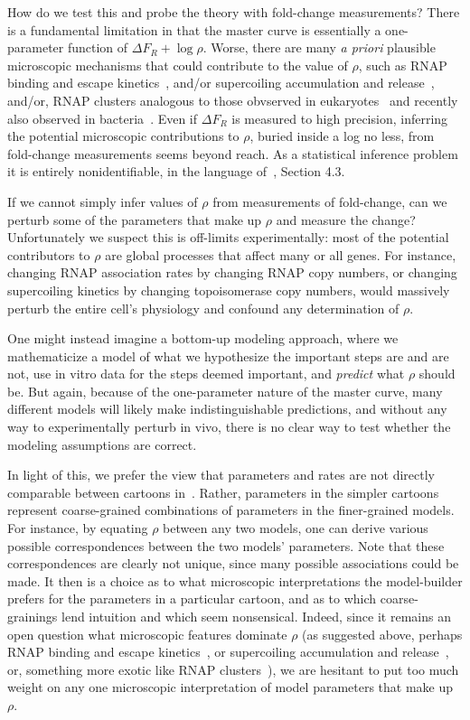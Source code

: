 How do we test this and probe the theory with fold-change measurements? There is
a fundamental limitation in that the master curve is essentially a one-parameter
function of $\Delta F_R + \log\rho$. Worse, there are many \textit{a priori}
plausible microscopic mechanisms that could contribute to the value of $\rho$,
such as RNAP binding and escape kinetics~\cite{DeHaseth1998, Mitarai2015},
and/or supercoiling accumulation and release~\cite{Chong2014, Sevier2016},
and/or, RNAP clusters analogous to those obvserved in
eukaryotes~\cite{Cisse2013, Cho2016} and recently also observed in
bacteria~\cite{Ladouceur2020}. Even if $\Delta F_R$ is measured to high
precision, inferring the potential microscopic contributions to $\rho$, buried
inside a log no less, from fold-change measurements seems beyond reach. As a
statistical inference problem it is entirely nonidentifiable, in the language
of~\cite{Gelman2013}, Section 4.3.

If we cannot simply infer values of $\rho$ from measurements of fold-change, can
we perturb some of the parameters that make up $\rho$ and measure the change?
Unfortunately we suspect this is off-limits experimentally: most of the
potential contributors to $\rho$ are global processes that affect many or all
genes. For instance, changing RNAP association rates by changing RNAP copy
numbers, or changing supercoiling kinetics by changing topoisomerase copy
numbers, would massively perturb the entire cell's physiology and confound any
determination of $\rho$.

One might instead imagine a bottom-up modeling approach, where we mathematicize a
model of what we hypothesize the important steps are and are not, use in vitro
data for the steps deemed important, and \textit{predict} what $\rho$ should be.
But again, because of the one-parameter nature of the master curve, many
different models will likely make indistinguishable predictions, and without any
way to experimentally perturb in vivo, there is no clear way to test whether the
modeling assumptions are correct.

In light of this, we prefer the view that parameters and rates are not directly
comparable between cartoons in~. Rather, parameters in
the simpler cartoons represent coarse-grained combinations of parameters in the
finer-grained models. For instance, by equating $\rho$ between any two models,
one can derive various possible correspondences between the two models'
parameters. Note that these correspondences are clearly not unique, since many
possible associations could be made. It then is a choice as to what microscopic
interpretations the model-builder prefers for the parameters in a particular
cartoon, and as to which coarse-grainings lend intuition and which seem
nonsensical. Indeed, since it remains an open question what microscopic features
dominate $\rho$ (as suggested above, perhaps RNAP binding and escape
kinetics~\cite{DeHaseth1998, Mitarai2015}, or supercoiling accumulation and
release~\cite{Chong2014, Sevier2016}, or, something more exotic like RNAP
clusters~\cite{Cisse2013, Cho2016, Ladouceur2020}), we are hesitant to put too
much weight on any one microscopic interpretation of model parameters that make
up $\rho$.

